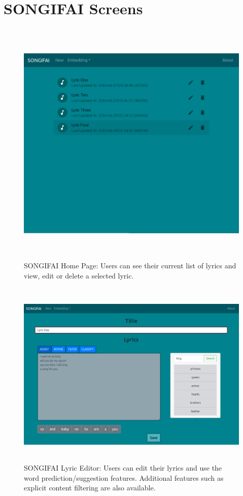 \documentclass[a4paper,11pt]{report}
\begin{document}
\chapter{SONGIFAI Screens}
\label{app:screen}
\begin{figure}[h]
	\centering
	\includegraphics[width=12cm, height=12cm]{./figures/fig20}
	\caption[SONGIFAI Home Page]{SONGIFAI Home Page: Users can see their current list of lyrics and view, edit or delete a selected lyric.}
	\label{fig:songifaihome}
\end{figure}
\begin{figure}
	\centering
	\includegraphics[width=13cm, height=9cm]{./figures/fig21}
	\caption[SONGIFAI Lyric Editor]{SONGIFAI Lyric Editor: Users can edit their lyrics and use the word prediction/suggestion features. Additional features such as explicit content filtering are also available.}
	\label{fig:songifaieditor}
\end{figure}

\end{document}
